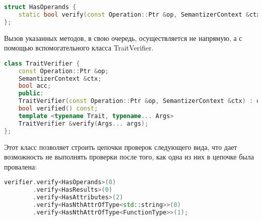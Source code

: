 \begin{lstlisting}[language=C++, caption=Пример класса-характеризатора]
struct HasOperands {
    static bool verify(const Operation::Ptr &op, SemantizerContext &ctx, size_t numOperands);
};
\end{lstlisting}

Вызов указанных методов, в свою очередь, осуществляется не напрямую, а с помощью вспомогательного класса TraitVerifier.

\begin{lstlisting}[language=C++, caption=Объявление класса TraitVerifier]
class TraitVerifier {
    const Operation::Ptr &op;
    SemantizerContext &ctx;
    bool acc;
    public:
    TraitVerifier(const Operation::Ptr &op, SemantizerContext &ctx) : op(op), ctx(ctx), acc(true){};
    bool verified() const;
    template <typename Trait, typename... Args>
    TraitVerifier &verify(Args... args);
};
\end{lstlisting}

Этот класс позволяет строить цепочки проверок следующего вида, что дает возможность не выполнять проверки после того, как одна из них в цепочке была провалена:

\begin{lstlisting}[language=C++, caption=Пример семантической верификации]
verifier.verify<HasOperands>(0)
        .verify<HasResults>(0)
        .verify<HasAttributes>(2)
        .verify<HasNthAttrOfType<std::string>>(0)
        .verify<HasNthAttrOfType<FunctionType>>(1);
\end{lstlisting}

